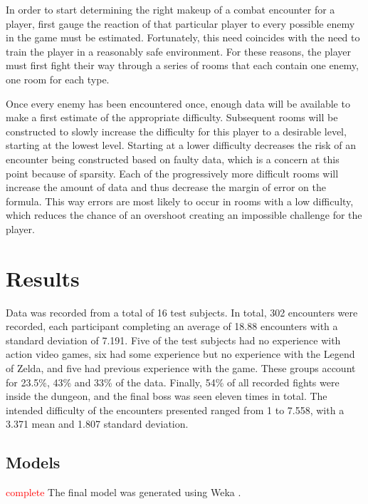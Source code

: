\documentclass[a4paper]{article}
\begin{document}
\begin{multicols*}{2}
In order to start determining the right makeup of a combat encounter for a player, first gauge the reaction of that particular player to every possible enemy in the game must be estimated. Fortunately, this need coincides with the need to train the player in a reasonably safe environment. For these reasons, the player must first fight their way through a series of rooms that each contain one enemy, one room for each type. 

Once every enemy has been encountered once, enough data will be available to make a first estimate of the appropriate difficulty. Subsequent rooms will be constructed to slowly increase the difficulty for this player to a desirable level, starting at the lowest level. Starting at a lower difficulty decreases the risk of an encounter being constructed based on faulty data, which is a concern at this point because of sparsity. Each of the progressively more difficult rooms will increase the amount of data and thus decrease the margin of error on the formula. This way errors are most likely to occur in rooms with a low difficulty, which reduces the chance of an overshoot creating an impossible challenge for the player.

\section{Results} \label{fig:results}
Data was recorded from a total of 16 test subjects. In total, 302 encounters were recorded, each participant completing an average of 18.88 encounters with a standard deviation of 7.191. Five of the test subjects had no experience with action video games, six had some experience but no experience with the Legend of Zelda, and five had previous experience with the game. These groups account for 23.5\%, 43\% and 33\% of the data. Finally, 54\% of all recorded fights were inside the dungeon, and the final boss was seen eleven times in total. The intended difficulty of the encounters presented ranged from 1 to 7.558, with a 3.371 mean and 1.807 standard deviation.

\subsection{Models}
\textcolor{red}{complete}
The final model was generated using Weka \cite{weka}.


\end{multicols*}
\end{document}
